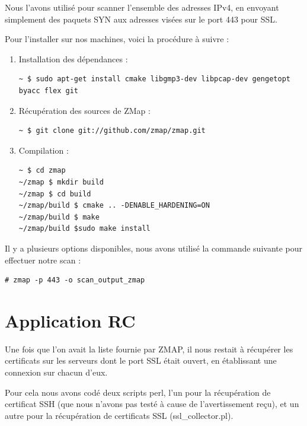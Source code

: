 \documentclass[a4paper,11pt,french]{article}
\begin{document}
Nous l'avons utilisé pour scanner l'ensemble des adresses IPv4, en envoyant simplement des paquets SYN aux adresses visées sur le port 443 pour SSL.

Pour l'installer sur nos machines, voici la procédure à suivre :

\begin{enumerate}
\item Installation des dépendances :
\begin{verbatim}
~ $ sudo apt-get install cmake libgmp3-dev libpcap-dev gengetopt byacc flex git
\end{verbatim}
\item Récupération des sources de ZMap :
\begin{verbatim}
~ $ git clone git://github.com/zmap/zmap.git
\end{verbatim}
\item Compilation :
\begin{verbatim}
~ $ cd zmap
~/zmap $ mkdir build
~/zmap $ cd build
~/zmap/build $ cmake .. -DENABLE_HARDENING=ON
~/zmap/build $ make
~/zmap/build $sudo make install
\end{verbatim}
\end{enumerate}

Il y a plusieurs options disponibles, nous avons utilisé la commande suivante pour effectuer notre scan :
\begin{verbatim}
# zmap -p 443 -o scan_output_zmap
\end{verbatim}

\section{Application RC}

Une fois que l'on avait la liste fournie par ZMAP, il nous restait à récupérer les certificats sur les serveurs dont le port SSL était ouvert, en établissant une connexion sur chacun d'eux.

Pour cela nous avons codé deux scripts perl, l'un pour la récupération de certificat SSH (que nous n'avons pas testé à cause de l'avertissement reçu), et un autre pour la récupération de certificats SSL (ssl\_collector.pl).
\end{document}
